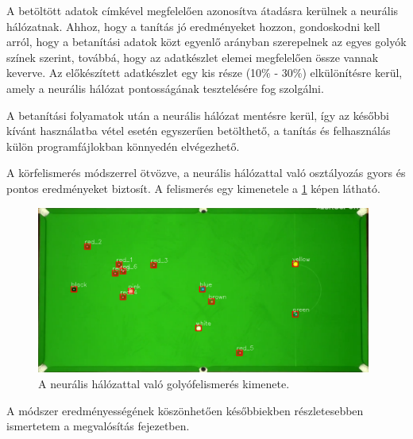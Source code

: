 \par A betöltött adatok címkével megfelelően azonosítva átadásra kerülnek a neurális hálózatnak. Ahhoz, hogy a tanítás jó eredményeket hozzon, gondoskodni kell arról, hogy a betanítási adatok közt egyenlő arányban szerepelnek az egyes golyók színek szerint, továbbá, hogy az adatkészlet elemei megfelelően össze vannak keverve. Az előkészített adatkészlet egy kis része (10\% - 30\%) elkülönítésre kerül, amely a neurális hálózat pontosságának tesztelésére fog szolgálni.
\par A betanítási folyamatok után a neurális hálózat mentésre kerül, így az későbbi kívánt használatba vétel esetén egyszerűen betölthető, a tanítás és felhasználás külön programfájlokban könnyedén elvégezhető.
\par A körfelismerés módszerrel ötvözve, a neurális hálózattal való osztályozás gyors és pontos eredményeket biztosít. A felismerés egy kimenetele a \ref{fig:felismert_asztal} képen látható.

\begin{figure}[!ht]
    \centering
    \includegraphics[width=110mm, keepaspectratio]{figures/recognised_table.png}
    \caption{A neurális hálózattal való golyófelismerés kimenete.}
    \label{fig:felismert_asztal}
\end{figure}

\par A módszer eredményességének köszönhetően későbbiekben részletesebben ismertetem a megvalósítás fejezetben.

